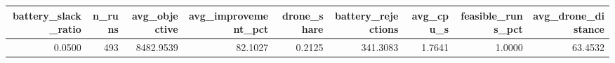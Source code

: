 \begin{tabular}{rrrrrrrrr}
\toprule
battery_slack_ratio & n_runs & avg_objective & avg_improvement_pct & drone_share & battery_rejections & avg_cpu_s & feasible_runs_pct & avg_drone_distance \\
\midrule
0.0500 & 493 & 8482.9539 & 82.1027 & 0.2125 & 341.3083 & 1.7641 & 1.0000 & 63.4532 \\
\bottomrule
\end{tabular}
